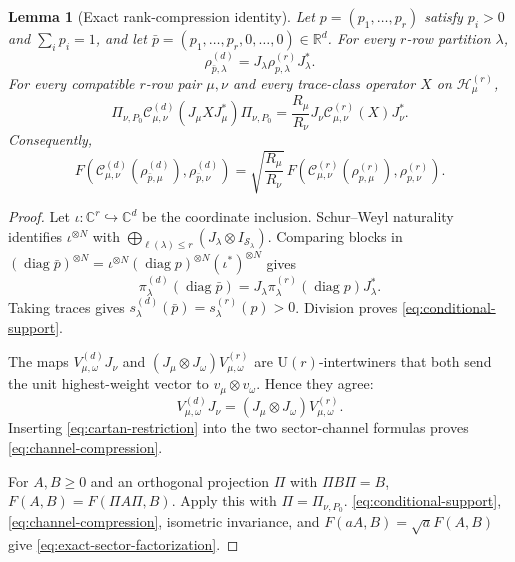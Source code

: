 \documentclass[11pt]{article}
\newtheorem{lemma}[lemma]{Lemma}
\theoremstyle{remark}
\theoremstyle{plain}
\newcommand{\C}{\mathbb C}
\newcommand{\R}{\mathbb R}
\newcommand{\cC}{\mathcal C}
\newcommand{\cH}{\mathcal H}
\newcommand{\cS}{\mathcal S}
\newcommand{\U}{\mathrm U}
\newcommand{\diag}{\operatorname{diag}}
\newcommand{\ot}{\otimes}
\begin{document}
\begin{lemma}[Exact rank-compression identity]
\label{lem:exact-compression}
Let \(p=(p_1,\ldots,p_r)\) satisfy \(p_i>0\) and \(\sum_i p_i=1\),
and let \(\bar p=(p_1,\ldots,p_r,0,\ldots,0)\in\R^d\).  For every
\(r\)-row partition \(\lambda\),
\begin{equation}
  \rho_{\bar p,\lambda}^{(d)}
  =J_\lambda\rho_{p,\lambda}^{(r)}J_\lambda^*.
  \label{eq:conditional-support}
\end{equation}
For every compatible \(r\)-row pair \(\mu,\nu\) and every trace-class
operator \(X\) on \(\cH_\mu^{(r)}\),
\begin{equation}
  \Pi_{\nu,P_0}\cC_{\mu,\nu}^{(d)}(J_\mu XJ_\mu^*)\Pi_{\nu,P_0}
  =\frac{R_\mu}{R_\nu}
   J_\nu\cC_{\mu,\nu}^{(r)}(X)J_\nu^*.
  \label{eq:channel-compression}
\end{equation}
Consequently,
\begin{equation}\label{eq:exact-sector-factorization}
 F\!\left(\cC_{\mu,\nu}^{(d)}(\rho_{\bar p,\mu}^{(d)}),
   \rho_{\bar p,\nu}^{(d)}\right)
 =\sqrt{\frac{R_\mu}{R_\nu}}\,
 F\!\left(\cC_{\mu,\nu}^{(r)}(\rho_{p,\mu}^{(r)}),
   \rho_{p,\nu}^{(r)}\right).
\end{equation}
\end{lemma}

\begin{proof}
Let \(\iota:\C^r\hookrightarrow\C^d\) be the coordinate inclusion.
Schur--Weyl naturality identifies \(\iota^{\ot N}\) with
\(\bigoplus_{\ell(\lambda)\le r}(J_\lambda\ot I_{\cS_\lambda})\).
Comparing blocks in
\((\diag\bar p)^{\ot N}
 =\iota^{\ot N}(\diag p)^{\ot N}(\iota^*)^{\ot N}\) gives
\[
  \pi_\lambda^{(d)}
    (\diag\bar p)
  =J_\lambda\pi_\lambda^{(r)}(\diag p)J_\lambda^*.
\]
Taking traces gives
\(s_\lambda^{(d)}(\bar p)=s_\lambda^{(r)}(p)>0\). Division proves
\eqref{eq:conditional-support}.

The maps \(V_{\mu,\omega}^{(d)}J_\nu\) and
\((J_\mu\ot J_\omega)V_{\mu,\omega}^{(r)}\) are \(\U(r)\)-intertwiners
that both send the unit highest-weight vector to
\(v_\mu\ot v_\omega\).  Hence they agree:
\begin{equation}
  V_{\mu,\omega}^{(d)}J_\nu
  =(J_\mu\ot J_\omega)V_{\mu,\omega}^{(r)}.
  \label{eq:cartan-restriction}
\end{equation}
Inserting \eqref{eq:cartan-restriction} into the two sector-channel formulas
proves \eqref{eq:channel-compression}.

For \(A,B\ge0\) and an orthogonal projection \(\Pi\) with
\(\Pi B\Pi=B\), \(F(A,B)=F(\Pi A\Pi,B)\).  Apply this with
\(\Pi=\Pi_{\nu,P_0}\). \eqref{eq:conditional-support},
\eqref{eq:channel-compression}, isometric invariance, and
\(F(aA,B)=\sqrt a F(A,B)\) give \eqref{eq:exact-sector-factorization}.
\end{proof}
\end{document}
